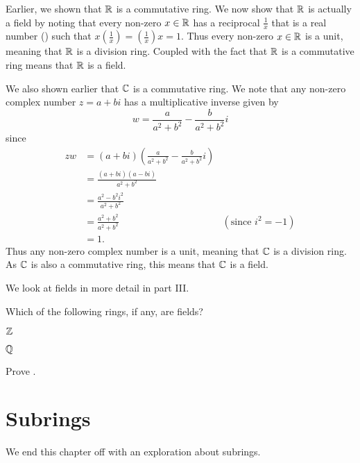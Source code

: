 \begin{example}
    Earlier, we shown that $\mathbb{R}$ is a commutative ring. We now show that $\mathbb{R}$ is actually a field by noting that every non-zero $x \in \mathbb{R}$ has a reciprocal $\frac1x$ that is a real number () such that $x\left(\frac1x\right) = \left(\frac1x\right)x = 1$. Thus every non-zero $x \in \mathbb{R}$ is a unit, meaning that $\mathbb{R}$ is a division ring. Coupled with the fact that $\mathbb{R}$ is a commutative ring means that $\mathbb{R}$ is a field.
\end{example}
\begin{example}
    We also shown earlier that $\mathbb{C}$ is a commutative ring. We note that any non-zero complex number $z = a + bi$ has a multiplicative inverse given by
    \[
        w = \frac{a}{a^2+b^2} - \frac{b}{a^2+b^2}i
    \]
    since
    \begin{align*}
        zw &= (a+bi)\left(\frac{a}{a^2+b^2} - \frac{b}{a^2+b^2}i\right)\\
        &= \frac{(a+bi)(a-bi)}{a^2+b^2}\\
        &= \frac{a^2 - b^2i^2}{a^2+b^2}\\
        &= \frac{a^2+b^2}{a^2+b^2} & (\text{since } i^2 = -1)\\
        &= 1.
    \end{align*}
    Thus any non-zero complex number is a unit, meaning that $\mathbb{C}$ is a division ring. As $\mathbb{C}$ is also a commutative ring, this means that $\mathbb{C}$ is a field.
\end{example}

We look at fields in more detail in part III.

\begin{exercise}
    Which of the following rings, if any, are fields?
    \begin{partquestions}{\alph*}
        \item $\mathbb{Z}$
        \item $\mathbb{Q}$
    \end{partquestions}
\end{exercise}

\begin{exercise}\label{exercise-product-of-units-is-unit}
    Prove .
\end{exercise}

\section{Subrings}
We end this chapter off with an exploration about subrings.

